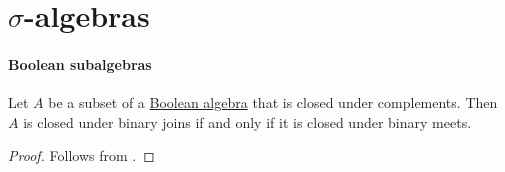 \section{\texorpdfstring{\( \sigma \)}{σ}-algebras}\label{sec:sigma_algebras}

\paragraph{Boolean subalgebras}

\begin{lemma}\label{thm:boolean_subalgebra_binary_de_morgan}
  Let \( A \) be a subset of a \hyperref[def:boolean_algebra]{Boolean algebra} that is closed under complements. Then \( A \) is closed under binary joins if and only if it is closed under binary meets.
\end{lemma}
\begin{proof}
  Follows from .
\end{proof}

